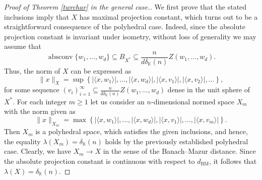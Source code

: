 \documentclass[12pt, reqno]{amsart}
\theoremstyle{definition}
\theoremstyle{remark}
\numberwithin{equation}{section}
\DeclareMathOperator{\absconv}{absconv}
\newcommand\dbm{d_{\mathrm{BM}}}
\begin{document}
\begin{proof}[Proof of Theorem \ref{twrchar} in the general case.] We first prove that the stated inclusions imply that $X$ has maximal projection constant, which turns out to be a straightforward consequence of the polyhedral case. Indeed, since the absolute projection constant is invariant under isometry, without loss of generality we may assume that
$$\absconv \{w_1, \ldots, w_d\} \subseteq B_{X^*} \subseteq  \frac{n}{d\delta_{\mathbb{K}}(n)} Z(w_1, \ldots, w_d).$$
Thus, the norm of $X$ can be expressed as
$$\|x\|_{X} =  \sup \left \{|\langle x, w_1 \rangle |, \ldots, |\langle x, w_d \rangle |,  |\langle x, v_1 \rangle|, |\langle x, v_2 \rangle|, \ldots \right \},$$
for some sequence $(v_i)_{i=1}^{\infty} \subseteq \frac{n}{d\delta_{\mathbb{K}}(n)} Z(w_1, \ldots, w_d)$ dense in the unit sphere of $X^{*}$. For each integer $m \geq 1$ let us consider an $n$-dimensional normed space $X_m$ with the norm given as
$$\|x\|_{X_m} =  \max \left \{|\langle x, w_1 \rangle |, \ldots, |\langle x, w_d \rangle |,  |\langle x, v_1 \rangle|, \ldots, |\langle x, v_m \rangle| \right \}.$$
Then $X_m$ is a polyhedral space, which satisfies the given inclusions, and hence, the equality $\lambda(X_m) = \delta_{\mathbb{K}}(n)$ holds by the previously established polyhedral case. Clearly, we have $X_m \to X$ in the sense of the Banach--Mazur distance. Since the absolute projection constant is continuous with respect to $\dbm$, it follows that $\lambda(X)=\delta_{\mathbb{K}}(n)$.


\end{proof}
\end{document}
